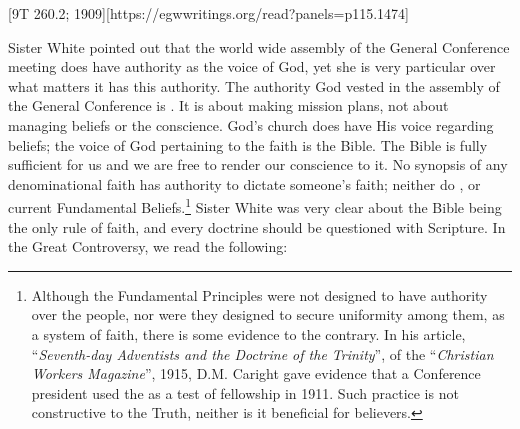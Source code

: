 [9T 260.2; 1909][https://egwwritings.org/read?panels=p115.1474]


Sister White pointed out that the world wide assembly of the General Conference meeting does have authority as the voice of God, yet she is very particular over what matters it has this authority. The authority God vested in the assembly of the General Conference is . It is about making mission plans, not about managing beliefs or the conscience. God’s church does have His voice regarding beliefs; the voice of God pertaining to the faith is the Bible. The Bible is fully sufficient for us and we are free to render our conscience to it. No synopsis of any denominational faith has authority to dictate someone's faith; neither do , or current Fundamental Beliefs.\footnote{Although the Fundamental Principles were not designed to have authority over the people, nor were they designed to secure uniformity among them, as a system of faith, there is some evidence to the contrary. In his article, “\textit{Seventh-day Adventists and the Doctrine of the Trinity}”, of the “\textit{Christian Workers Magazine}”, 1915, D.M. Caright gave evidence that a Conference president used the  as a test of fellowship in 1911. Such practice is not constructive to the Truth, neither is it beneficial for believers.} Sister White was very clear about the Bible being the only rule of faith, and every doctrine should be questioned with Scripture. In the Great Controversy, we read the following:


